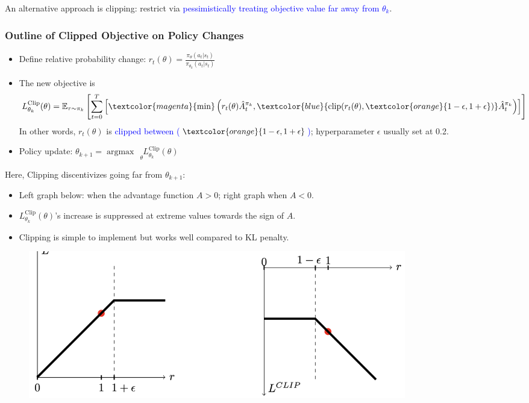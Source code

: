 \documentclass{article}
\begin{document}
An alternative approach is clipping: restrict via \textcolor{blue}{pessimistically treating objective value far away from $\theta_k$}.
\begin{thmbox}
    \subsubsection*{Outline of Clipped Objective on Policy Changes}
    \begin{itemize}
    \item Define relative probability change: $r_{t}(\theta) = \frac{\pi_{\theta} (a_t | s_t)}{\pi_{\theta_k} (a_t | s_t)}$ 
    \item The new objective is
        \begin{equation*}
            L_{\theta_{k}}^{\text{Clip}} (\theta) 
            = \mathbb{E}_{\tau \sim \pi_{k}} \left[ \sum_{t = 0}^{T} \left[ \textcolor{magenta}{\min} \left( r_{t} (\theta) \hat{A}_t^{\pi_{k}}, \textcolor{blue}{\text{clip}(r_{t}(\theta), \textcolor{orange}{1 - \epsilon, 1 + \epsilon})} \hat{A}_t^{\pi_{k}} \right) \right] \right]
        \end{equation*}
        In other words, $r_{t} (\theta)$ is \textcolor{blue}{clipped between ($\textcolor{orange}{1 - \epsilon, 1 + \epsilon}$)}; hyperparameter $\epsilon$ usually set at 0.2.
    \item Policy update: $\theta_{k+1} = \mathop{\arg\max} ~~~ \limits_{\theta} L_{\theta_{k}}^{\text{Clip}} (\theta)$
    \end{itemize}
\end{thmbox}

Here, Clipping discentivizes going far from $\theta_{k+1}$:
\begin{itemize}
\item Left graph below: when the advantage function $A > 0$; right graph when $A < 0$.
\item $L_{\theta_{k}}^{\text{Clip}} (\theta)$'s increase is suppressed at extreme values towards the sign of $A$.
\item Clipping is simple to implement but works well compared to KL penalty.
\end{itemize}

\begin{figure}
    \includegraphics[width=0.8\textwidth]{lec6-clipped-values.png}
\end{figure}
\end{document}
